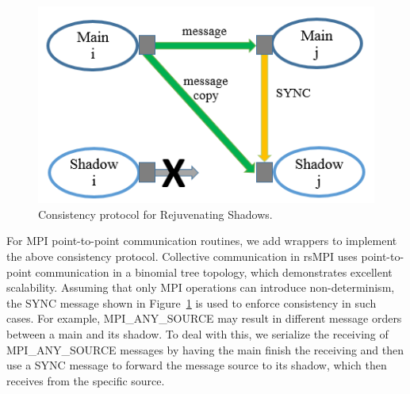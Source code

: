 \begin{figure}[!t]
  \begin{center}
      	\includegraphics[width=0.7\columnwidth]{figures/cons_protocol_hpcc.png}
  \end{center}
  \vskip -0.2in
  \caption{Consistency protocol for Rejuvenating Shadows.}
  \label{fig:cons_protocol}
  \vskip -0.2in
\end{figure}

For MPI point-to-point communication routines, we add wrappers to implement the above consistency protocol. %
Collective communication in rsMPI uses point-to-point communication in a binomial tree topology, which demonstrates excellent scalability.
Assuming that only MPI operations can introduce non-determinism, the SYNC message shown in Figure~\ref{fig:cons_protocol} is used to enforce consistency in such cases. For example, MPI\_ANY\_SOURCE may result in different message orders between a main and its shadow. To deal with this, we serialize the receiving of MPI\_ANY\_SOURCE messages by having the main finish the receiving and then use a SYNC message to forward the message source to its shadow, which then receives from the specific source. 

